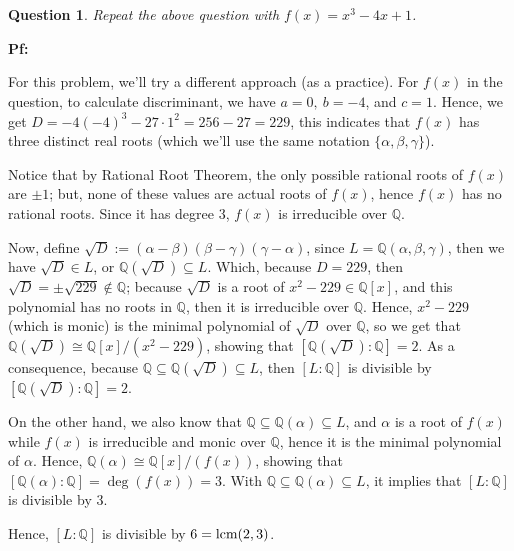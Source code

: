 \documentclass{article}
\newtheorem{question}{Question}
\newcommand{\QQ}{\mathbb{Q}}
\newcommand{\lcm}{\textmd{lcm}}
\begin{document}
\break

\section{}%
\begin{question}\label{q3}
    Repeat the above question with $f(x)=x^3-4x+1$.
\end{question}

\textbf{Pf:}

For this problem, we'll try a different approach (as a practice). For $f(x)$ in the question, to calculate discriminant, we have $a=0,\ b=-4$, and $c=1$. Hence, we get $D = -4(-4)^3-27\cdot 1^2 = 256 - 27 = 229$, this indicates that $f(x)$ has three distinct real roots (which we'll use the same notation $\{\alpha,\beta,\gamma\}$). 

Notice that by Rational Root Theorem, the only possible rational roots of $f(x)$ are $\pm 1$; but, none of these values are actual roots of $f(x)$, hence $f(x)$ has no rational roots. Since it has degree $3$, $f(x)$ is irreducible over $\QQ$.

Now, define $\sqrt{D}:=(\alpha-\beta)(\beta-\gamma)(\gamma-\alpha)$, since $L=\QQ(\alpha,\beta,\gamma)$, then we have $\sqrt{D}\in L$, or $\QQ(\sqrt{D})\subseteq L$. Which, because $D=229$, then $\sqrt{D}=\pm \sqrt{229}\notin \QQ$; because $\sqrt{D}$ is a root of $x^2-229\in \QQ[x]$, and this polynomial has no roots in $\QQ$, then it is irreducible over $\QQ$. Hence, $x^2-229$ (which is monic) is the minimal polynomial of $\sqrt{D}$ over $\mathbb{Q}$, so we get that $\QQ(\sqrt{D})\cong \QQ[x]/(x^2-229)$, showing that $[\QQ(\sqrt{D}):\QQ]=2$. As a consequence, because $\QQ\subseteq \QQ(\sqrt{D})\subseteq L$, then $[L:\QQ]$ is divisible by $[\QQ(\sqrt{D}):\QQ]=2$.

On the other hand, we also know that $\QQ\subseteq\QQ(\alpha)\subseteq L$, and $\alpha$ is a root of $f(x)$ while $f(x)$ is irreducible and monic over $\QQ$, hence it is the minimal polynomial of $\alpha$. Hence, $\QQ(\alpha)\cong \QQ[x]/(f(x))$, showing that $[\QQ(\alpha):\QQ]=\deg(f(x))=3$. With $\QQ\subseteq\QQ(\alpha)\subseteq L$, it implies that $[L:\QQ]$ is divisible by $3$.

Hence, $[L:\QQ]$ is divisible by $6 = \lcm(2,3)$.
\end{document}
